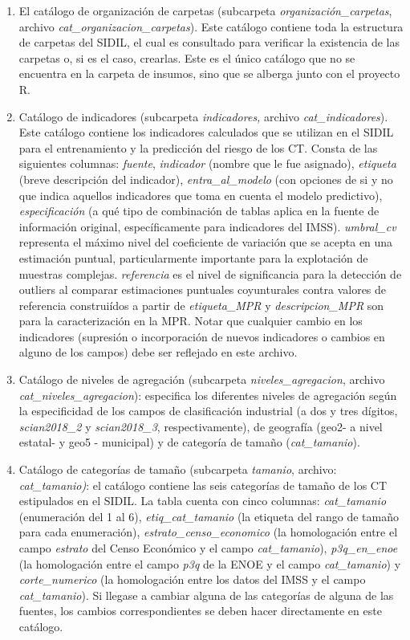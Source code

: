 \documentclass[
]{article}
\begin{document}
\begin{enumerate}
  \begin{enumerate}
  \def\labelenumii{\alph{enumii}.}
  \item
    El catálogo de organización de carpetas (subcarpeta \emph{organización\_carpetas}, archivo \emph{cat\_organizacion\_carpetas}). Este catálogo contiene toda la estructura de carpetas del SIDIL, el cual es consultado para verificar la existencia de las carpetas o, si es el caso, crearlas. Este es el único catálogo que no se encuentra en la carpeta de insumos, sino que se alberga junto con el proyecto R.
  \item
    Catálogo de indicadores (subcarpeta \emph{indicadores,} archivo \emph{cat\_indicadores}). Este catálogo contiene los indicadores calculados que se utilizan en el SIDIL para el entrenamiento y la predicción del riesgo de los CT. Consta de las siguientes columnas: \emph{fuente}, \emph{indicador} (nombre que le fue asignado), \emph{etiqueta} (breve descripción del indicador), \emph{entra\_al\_modelo} (con opciones de si y no que indica aquellos indicadores que toma en cuenta el modelo predictivo), \emph{especificación} (a qué tipo de combinación de tablas aplica en la fuente de información original, específicamente para indicadores del IMSS). \emph{umbral\_cv} representa el máximo nivel del coeficiente de variación que se acepta en una estimación puntual, particularmente importante para la explotación de muestras complejas. \emph{referencia} es el nivel de significancia para la detección de outliers al comparar estimaciones puntuales coyunturales contra valores de referencia construiídos a partir de \emph{etiqueta\_MPR} y \emph{descripcion\_MPR} son para la caracterización en la MPR. Notar que cualquier cambio en los indicadores (supresión o incorporación de nuevos indicadores o cambios en alguno de los campos) debe ser reflejado en este archivo.
  \item
    Catálogo de niveles de agregación (subcarpeta \emph{niveles\_agregacion}, archivo \emph{cat\_niveles\_agregacion}): especifica los diferentes niveles de agregación según la especificidad de los campos de clasificación industrial (a dos y tres dígitos, \emph{scian2018\_2} y \emph{scian2018\_3}, respectivamente), de geografía (geo2- a nivel estatal- y geo5 - municipal) y de categoría de tamaño (\emph{cat\_tamanio}).
  \item
    Catálogo de categorías de tamaño (subcarpeta \emph{tamanio}, archivo: \emph{cat\_tamanio)}: el catálogo contiene las seis categorías de tamaño de los CT estipulados en el SIDIL. La tabla cuenta con cinco columnas: \emph{cat\_tamanio} (enumeración del 1 al 6), \emph{etiq\_cat\_tamanio} (la etiqueta del rango de tamaño para cada enumeración), \emph{estrato\_censo\_economico} (la homologación entre el campo \emph{estrato} del Censo Económico y el campo \emph{cat\_tamanio}), \emph{p3q\_en\_enoe} (la homologación entre el campo \emph{p3q} de la ENOE y el campo \emph{cat\_tamanio}) y \emph{corte\_numerico} (la homologación entre los datos del IMSS y el campo \emph{cat\_tamanio}). Si llegase a cambiar alguna de las categorías de alguna de las fuentes, los cambios correspondientes se deben hacer directamente en este catálogo.

\end{enumerate}
\end{enumerate}
\end{document}
